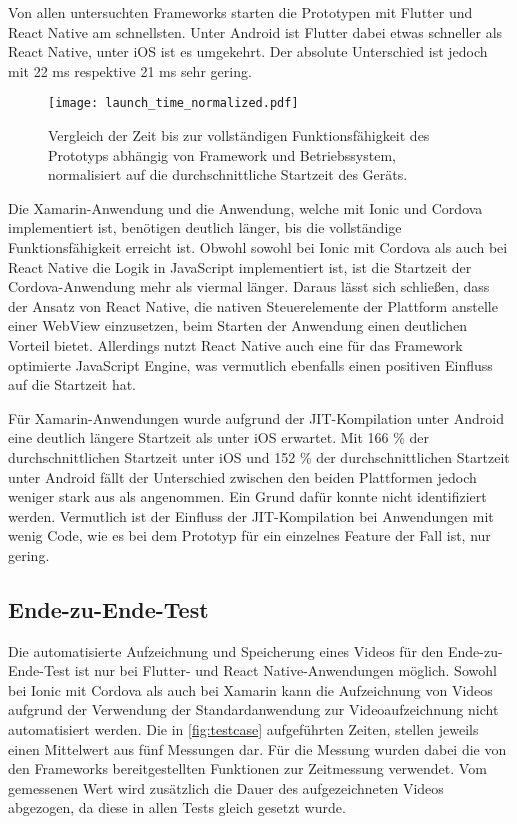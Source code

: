 Von allen untersuchten Frameworks starten die Prototypen mit Flutter und React Native am schnellsten.
Unter Android ist Flutter dabei etwas schneller als React Native, unter iOS ist es umgekehrt.
Der absolute Unterschied ist jedoch mit 22 ms respektive 21 ms sehr gering.

\begin{figure}[ht]
  \centering 
  \texttt{[image: launch\_time\_normalized.pdf]}
  \caption{Vergleich der Zeit bis zur vollständigen Funktionsfähigkeit des Prototyps abhängig von Framework und Betriebssystem, normalisiert auf die durchschnittliche Startzeit des Geräts.}
  \label{fig:launch_time_normalized}
\end{figure}
Die Xamarin-Anwendung und die Anwendung, welche mit Ionic und Cordova implementiert ist, benötigen deutlich länger, bis die vollständige Funktionsfähigkeit erreicht ist.
Obwohl sowohl bei Ionic mit Cordova als auch bei React Native die Logik in JavaScript implementiert ist, ist die Startzeit der Cordova-Anwendung mehr als viermal länger.
Daraus lässt sich schließen, dass der Ansatz von React Native, die nativen Steuerelemente der Plattform anstelle einer WebView einzusetzen, beim Starten der Anwendung einen deutlichen Vorteil bietet.
Allerdings nutzt React Native auch eine für das Framework optimierte JavaScript Engine, was vermutlich ebenfalls einen positiven Einfluss auf die Startzeit hat.

Für Xamarin-Anwendungen wurde aufgrund der \ac{JIT}-Kompilation unter Android eine deutlich längere Startzeit als unter iOS erwartet.
Mit 166 \% der durchschnittlichen Startzeit unter iOS und 152 \% der durchschnittlichen Startzeit unter Android fällt der Unterschied zwischen den beiden Plattformen jedoch weniger stark aus als angenommen.
Ein Grund dafür konnte nicht identifiziert werden.
Vermutlich ist der Einfluss der \ac{JIT}-Kompilation bei Anwendungen mit wenig Code, wie es bei dem Prototyp für ein einzelnes Feature der Fall ist, nur gering.

\subsection{Ende-zu-Ende-Test}

Die automatisierte Aufzeichnung und Speicherung eines Videos für den Ende-zu-Ende-Test ist nur bei Flutter- und React Native-Anwendungen möglich.
Sowohl bei Ionic mit Cordova als auch bei Xamarin kann die Aufzeichnung von Videos aufgrund der Verwendung der Standardanwendung zur Videoaufzeichnung nicht automatisiert werden.
Die in \autoref{fig:testcase} aufgeführten Zeiten, stellen jeweils einen Mittelwert aus fünf Messungen dar.
Für die Messung wurden dabei die von den Frameworks bereitgestellten Funktionen zur Zeitmessung verwendet.
Vom gemessenen Wert wird zusätzlich die Dauer des aufgezeichneten Videos abgezogen, da diese in allen Tests gleich gesetzt wurde.


